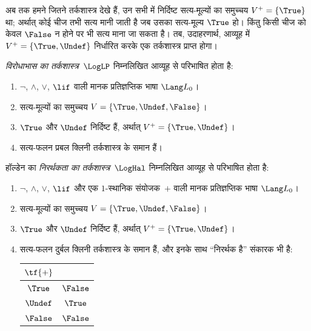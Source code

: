 \documentclass[../../../include/open-logic-section]{subfiles}
\begin{document}


अब तक हमने जितने तर्कशास्त्र देखे हैं, उन सभी में निर्दिष्ट सत्य-मूल्यों का
समुच्चय $V^+ = \{\True\}$ था; अर्थात् कोई चीज तभी सत्य मानी जाती है जब
उसका सत्य-मूल्य $\True$ हो। किंतु किसी चीज को केवल $\False$ न होने पर भी
सत्य माना जा सकता है। तब, उदाहरणार्थ, आव्यूह में $V^+ = \{\True,
\Undef\}$ निर्धारित करके एक तर्कशास्त्र प्राप्त होगा।

\begin{defn}
\emph{विरोधाभास का तर्कशास्त्र}~$\LogLP$ निम्नलिखित आव्यूह से परिभाषित होता
है:
\begin{enumerate}
  \item $\lnot$, $\land$, $\lor$, $\lif$ वाली मानक प्रतिज्ञप्तिक भाषा
  $\Lang L_0$।
  \item सत्य-मूल्यों का समुच्चय $V = \{\True, \Undef, \False\}$।
  \item $\True$ और $\Undef$ निर्दिष्ट हैं, अर्थात्
  $V^+ = \{\True, \Undef\}$।
  \item सत्य-फलन प्रबल क्लिनी तर्कशास्त्र के समान हैं।
\end{enumerate}
\end{defn}

\begin{defn}
हॉल्डेन का \emph{निरर्थकता का तर्कशास्त्र}~$\LogHal$ निम्नलिखित आव्यूह से
परिभाषित होता है:
\begin{enumerate}
  \item $\lnot$, $\land$, $\lor$, $\lif$ और एक $1$-स्थानिक संयोजक~$+$
  वाली मानक प्रतिज्ञप्तिक भाषा $\Lang L_0$।
  \item सत्य-मूल्यों का समुच्चय $V = \{\True, \Undef, \False\}$।
  \item $\True$ और $\Undef$ निर्दिष्ट हैं, अर्थात्
  $V^+ = \{\True, \Undef\}$।
  \item सत्य-फलन दुर्बल क्लिनी तर्कशास्त्र के समान हैं, और इनके साथ
  ``निरर्थक है'' संकारक भी है:
  \begin{center}
    \begin{tabular}{c|c} 
    $\tf{+}$ & \\ 
    \hline  
    $\True$ & $\False$ \\ 
    $\Undef$ & $\True$ \\
    $\False$ & $\False$ 
    \end{tabular}
  \end{center}
\end{enumerate}
\end{defn}
\end{document}

